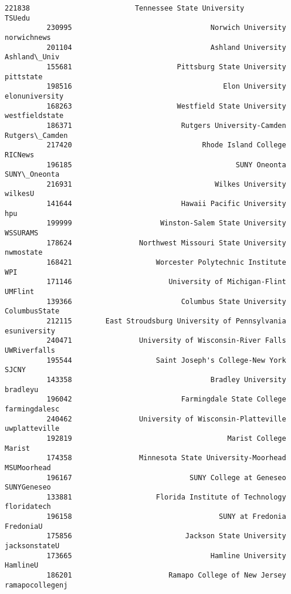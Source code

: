 \documentclass[11pt]{article}
\begin{document}
\begin{Verbatim}[commandchars=\\\{\}]
          221838                         Tennessee State University           TSUedu   
          230995                                 Norwich University      norwichnews   
          201104                                 Ashland University     Ashland\_Univ   
          155681                         Pittsburg State University        pittstate   
          198516                                    Elon University   elonuniversity   
          168263                         Westfield State University   westfieldstate   
          186371                          Rutgers University-Camden   Rutgers\_Camden   
          217420                               Rhode Island College          RICNews   
          196185                                       SUNY Oneonta     SUNY\_Oneonta   
          216931                                  Wilkes University          wilkesU   
          141644                          Hawaii Pacific University              hpu   
          199999                     Winston-Salem State University         WSSURAMS   
          178624                Northwest Missouri State University        nwmostate   
          168421                    Worcester Polytechnic Institute              WPI   
          171146                       University of Michigan-Flint          UMFlint   
          139366                          Columbus State University    ColumbusState   
          212115        East Stroudsburg University of Pennsylvania     esuniversity   
          240471                University of Wisconsin-River Falls     UWRiverfalls   
          195544                    Saint Joseph's College-New York            SJCNY   
          143358                                 Bradley University         bradleyu   
          196042                          Farmingdale State College    farmingdalesc   
          240462                University of Wisconsin-Platteville    uwplatteville   
          192819                                     Marist College           Marist   
          174358                Minnesota State University-Moorhead      MSUMoorhead   
          196167                            SUNY College at Geneseo      SUNYGeneseo   
          133881                    Florida Institute of Technology      floridatech   
          196158                                   SUNY at Fredonia        FredoniaU   
          175856                           Jackson State University    jacksonstateU   
          173665                                 Hamline University         HamlineU   
          186201                       Ramapo College of New Jersey  ramapocollegenj   

\end{Verbatim}
\end{document}
